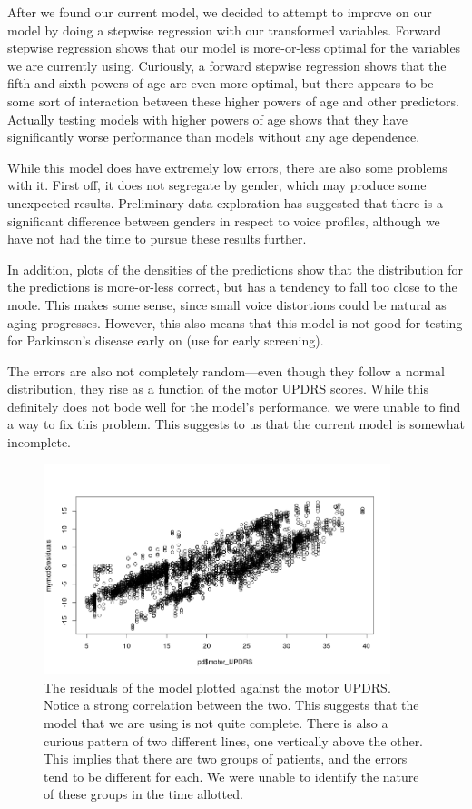 \documentclass{report}
\begin{document}
After we found our current model, we decided to attempt to improve on our model by doing a stepwise regression with our transformed variables. Forward stepwise regression shows that our model is more-or-less optimal for the variables we
are currently using. Curiously, a forward stepwise regression shows that the fifth and sixth powers of age are even more optimal, but there appears to be some sort of interaction between these higher powers of age and other predictors. 
Actually testing models with higher powers of age shows that they have significantly worse performance than models without any age dependence.

While this model does have extremely low errors, there are also some problems with it. First off, it does not segregate by gender, which may produce some unexpected results. Preliminary
data exploration has suggested that there is a significant difference between genders in respect to voice profiles, although we have not had the time to pursue these results further.

In addition, plots of the densities of the predictions show that the distribution for the predictions is more-or-less correct, but has a tendency to fall too close to the mode. This makes
some sense, since small voice distortions could be natural as aging progresses. %
However, this also means that this model is not good for testing for Parkinson's disease early on (use for early screening).

The errors are also not completely random---even though they follow a normal distribution, they rise as a function of the motor UPDRS scores. While this definitely does not bode well for the model's performance,
we were unable to find a way to fix this problem. This suggests to us that the current model is somewhat incomplete.

\begin{figure}

\centering
\includegraphics[width=0.9\textwidth]{resid_vs_motor}

\caption{The residuals of the model plotted against the motor UPDRS. Notice a strong correlation between the two. This suggests that the model that we are using is not quite complete. There is also a curious pattern of two
different lines, one vertically above the other. This implies that there are two groups of patients, and the errors tend to be different for each. We were unable to identify the nature of these groups in the time allotted.}

\end{figure}
\end{document}
